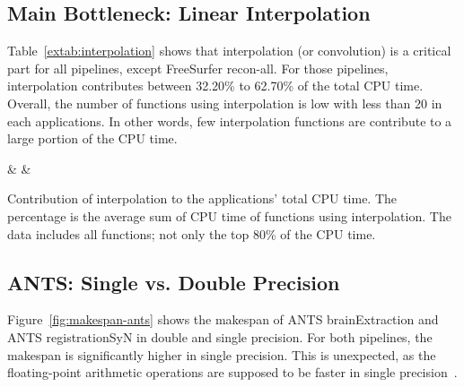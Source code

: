 \documentclass[conference]{IEEEtran}
\begin{document}
\subsection{Main Bottleneck: Linear Interpolation}
Table~\ref{extab:interpolation} shows that interpolation (or convolution) is a critical part for all pipelines, except FreeSurfer recon-all. For those pipelines, interpolation contributes between 32.20\% to 62.70\% of the total CPU time. Overall, the number of functions using interpolation is low with less than 20 in each applications. In other words, few interpolation functions are contribute to a large portion of the CPU time.
			
\begin{table}[h]
	\centering
	{\pipeline & \nfunc & \tablenum[round-precision=2]{\cputime}}
	\caption{Contribution of interpolation to the applications' total CPU time. The percentage is the average sum of CPU time of functions using interpolation. The data includes all functions; not only the top 80\% of the CPU time.}
	\label{extab:interpolation}
\end{table}
						
						
\subsection{ANTS: Single vs. Double Precision}
Figure~\ref{fig:makespan-ants} shows the makespan of ANTS brainExtraction and ANTS registrationSyN in double and single precision. For both pipelines, the makespan is significantly higher in single precision. This is unexpected, as the floating-point arithmetic operations are supposed to be faster in single precision~\cite{Wang2018-jv}.
\end{document}
